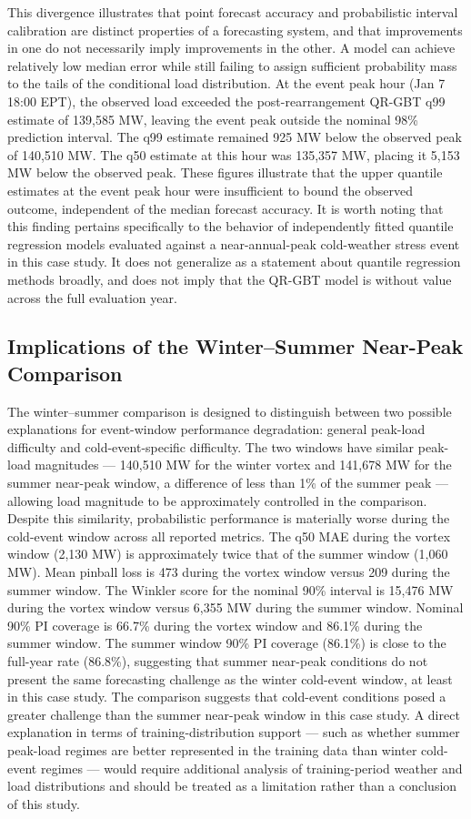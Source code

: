 \documentclass[12pt,a4paper]{article}
\begin{document}
This divergence illustrates that point forecast accuracy and probabilistic interval calibration are distinct properties of a forecasting system, and that improvements in one do not necessarily imply improvements in the other. A model can achieve relatively low median error while still failing to assign sufficient probability mass to the tails of the conditional load distribution.
At the event peak hour (Jan 7 18:00 EPT), the observed load exceeded the post-rearrangement QR-GBT q99 estimate of 139,585 MW, leaving the event peak outside the nominal 98\% prediction interval. The q99 estimate remained 925 MW below the observed peak of 140,510 MW. The q50 estimate at this hour was 135,357 MW, placing it 5,153 MW below the observed peak. These figures illustrate that the upper quantile estimates at the event peak hour were insufficient to bound the observed outcome, independent of the median forecast accuracy.
It is worth noting that this finding pertains specifically to the behavior of independently fitted quantile regression models evaluated against a near-annual-peak cold-weather stress event in this case study. It does not generalize as a statement about quantile regression methods broadly, and does not imply that the QR-GBT model is without value across the full evaluation year.
\subsection{Implications of the Winter--Summer Near-Peak Comparison}
The winter–summer comparison is designed to distinguish between two possible explanations for event-window performance degradation: general peak-load difficulty and cold-event-specific difficulty. The two windows have similar peak-load magnitudes --- 140,510 MW for the winter vortex and 141,678 MW for the summer near-peak window, a difference of less than 1\% of the summer peak --- allowing load magnitude to be approximately controlled in the comparison.
Despite this similarity, probabilistic performance is materially worse during the cold-event window across all reported metrics. The q50 MAE during the vortex window (2,130 MW) is approximately twice that of the summer window (1,060 MW). Mean pinball loss is 473 during the vortex window versus 209 during the summer window. The Winkler score for the nominal 90\% interval is 15,476 MW during the vortex window versus 6,355 MW during the summer window. Nominal 90\% PI coverage is 66.7\% during the vortex window and 86.1\% during the summer window.
The summer window 90\% PI coverage (86.1\%) is close to the full-year rate (86.8\%), suggesting that summer near-peak conditions do not present the same forecasting challenge as the winter cold-event window, at least in this case study. The comparison suggests that cold-event conditions posed a greater challenge than the summer near-peak window in this case study. A direct explanation in terms of training-distribution support --- such as whether summer peak-load regimes are better represented in the training data than winter cold-event regimes --- would require additional analysis of training-period weather and load distributions and should be treated as a limitation rather than a conclusion of this study.
\end{document}
